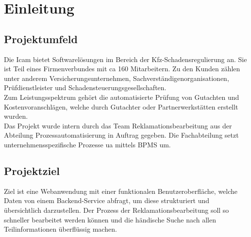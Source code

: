 \section{Einleitung}
\label{sec:Einleitung}


\subsection{Projektumfeld} 
\label{sec:Projektumfeld}
Die \ac{Icam} bietet Softwarelösungen im Bereich der Kfz-Schadensregulierung an.
Sie ist Teil eines Firmenverbundes mit \acs{ca} 160 Mitarbeitern. Zu den Kunden zählen unter
anderem Versicherungsunternehmen, Sachverständigenorganisationen, Prüfdienstleister und
Schadensteuerungsgesellschaften.\\
Zum Leistungsspektrum gehört die automatisierte Prüfung von Gutachten und
Kostenvoranschlägen, welche durch Gutachter oder Partnerwerkstätten erstellt wurden.\\
Das Projekt wurde intern durch das Team Reklamationsbearbeitung aus der Abteilung Prozessautomatisierung
in Auftrag gegeben. Die Fachabteilung setzt unternehmensspezifische Prozesse \acs{ua} mittels
\ac{BPMS} um.	


\subsection{Projektziel} 
\label{sec:Projektziel}
Ziel ist eine Webanwendung mit einer funktionalen Benutzeroberfläche, welche Daten von
einem Backend-Service abfragt, um diese strukturiert und übersichtlich darzustellen.
Der Prozess der Reklamationsbearbeitung soll so schneller bearbeitet werden können und die händische Suche nach
allen Teilinformationen überflüssig machen.

